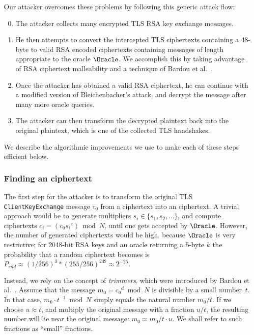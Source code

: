 Our attacker overcomes these problems by following this generic attack flow:
\begin{enumerate}
 \setcounter{enumi}{-1}
	\item The attacker collects many encrypted TLS RSA key exchange messages.
	\item He then attempts to convert the intercepted TLS ciphertexts containing a 48-byte \pms to valid RSA \PKCS encoded ciphertexts containing messages of length appropriate to the \ssltwo oracle $\Oracle$. We accomplish this by taking advantage of RSA ciphertext malleability and a technique of Bardou et al.~\cite{bardou2012efficient}.
	\item Once the attacker has obtained a valid \ssltwo RSA ciphertext, he can continue with a modified version of Bleichenbacher's attack, and decrypt the message after many more oracle queries.
	\item The attacker can then transform the decrypted plaintext back into the original plaintext, which is one of the collected TLS handshakes.
\end{enumerate}

We describe the algorithmic improvements we use to make each of these steps efficient below.

\subsubsection{Finding an \sslconform ciphertext}
\label{sec:trimmers}
The first step for the attacker is to transform the original TLS \texttt{ClientKeyExchange} message $c_0$ from a \tlsconform ciphertext into an \sslconform ciphertext. 
A trivial approach would be to generate multipliers $s_i \in \{s_1,s_2,\ldots\}$, and compute ciphertexts $c_i = (c_0 {s_i}^e) \bmod N$, until one gets accepted by $\Oracle$.
However, the number of generated ciphertexts would be high, because $\Oracle$ is very restrictive; for 2048-bit RSA keys and an oracle returning a 5-byte $k$ the probability that a random ciphertext becomes \sslconform is $P_{rnd} \approx (1/256)^3 * (255/256)^{249} \approx 2^{-25}$.

Instead, we rely on the concept of \emph{trimmers}, which were introduced by Bardou et al.~\cite{bardou2012efficient}. 
Assume that the message $m_{0} = {c_0}^d \bmod N$ is divisible by a small number~$t$. In that case,  $m_{0} \cdot t^{-1} \bmod{N}$ simply equals the natural number $m_{0} / t$. 
If we choose $u \approx t$, and multiply the original message with a fraction $u/t$, the resulting number will lie near the original message: $m_0 \approx m_0 / t \cdot u$.   We shall refer to such fractions as ``small'' fractions.

